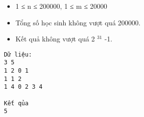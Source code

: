 \begin{itemize}
	\item     1 ≤ n ≤ 200000, 1 ≤ m ≤ 20000   
	\item     Tổng số học sinh không vượt quá 200000.   
	\item     Kết quả không vượt quá 2    $^     31    $    -1.   
\end{itemize}
\begin{verbatim}
Dữ liệu:
3 5
1 2 0 1
1 1 2
1 4 0 2 3 4

Kết qủa
5
\end{verbatim}